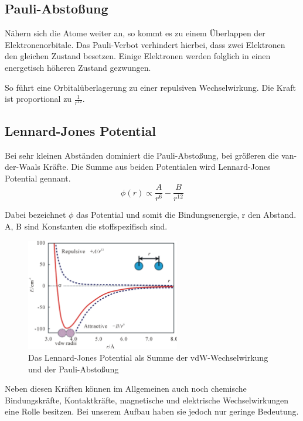         \subsection{Pauli-Abstoßung}

Nähern sich die Atome weiter an, so kommt es zu einem Überlappen der 
Elektronenorbitale. Das Pauli-Verbot verhindert hierbei, dass zwei Elektronen den
gleichen Zustand besetzen. Einige Elektronen werden folglich in einen energetisch
höheren Zustand gezwungen. \par
So führt eine Orbitalüberlagerung zu einer repulsiven Wechselwirkung. Die Kraft
ist proportional zu $\displaystyle \frac{1}{r^{12}}$.

        \subsection{Lennard-Jones Potential}

Bei sehr kleinen Abständen dominiert die Pauli-Abstoßung, bei größeren die 
van-der-Waals Kräfte. Die Summe aus beiden Potentialen wird Lennard-Jones 
Potential gennant. 
\[
   \phi (r) \propto \frac{A}{r^6} - \frac{B}{r^{12}}    
\]

Dabei bezeichnet $\phi$ das Potential und somit die Bindungsenergie, r den Abstand.
A, B sind Konstanten die stoffspezifisch sind.

\begin{figure}[h!]
    \centering
    \includegraphics[width=0.6\textwidth]{Abb/ljp.jpg}
    \caption{Das Lennard-Jones Potential als Summe der vdW-Wechselwirkung und
             der Pauli-Abstoßung}
    \label{ljp}
\end{figure}



Neben diesen Kräften können im Allgemeinen auch noch chemische Bindungskräfte, Kontaktkräfte, magnetische und elektrische Wechselwirkungen eine Rolle besitzen.
Bei unserem Aufbau haben sie jedoch nur geringe Bedeutung.

